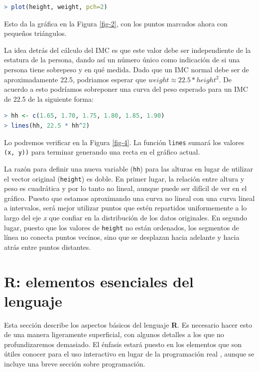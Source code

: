 \begin{lstlisting}[language=R]
> plot(height, weight, pch=2)
\end{lstlisting}

Esto da la gráfica en la Figura \ref{fig-2}, con los puntos marcados ahora
con pequeños triángulos.

La idea detrás del cálculo del IMC es que este valor debe ser independiente de
la estatura de la persona, dando así un número único como indicación de si una
persona tiene sobrepeso y en qué medida. Dado que un IMC normal debe ser de
aproximadamente 22.5, podriamos esperar que $weight \approx 22.5 * height^2$.
De acuerdo a esto podríamos sobreponer una curva del peso esperado para un IMC
de 22.5 de la siguiente forma:

\begin{lstlisting}[language=R]
> hh <- c(1.65, 1.70, 1.75, 1.80, 1.85, 1.90)
> lines(hh, 22.5 * hh^2)
\end{lstlisting}

Lo podremos verificar en la Figura \ref{fig-4}. La función \texttt{lines}
sumará los valores \texttt{(x, y))} para terminar generando una recta en el
gráfico actual.

La razón para definir una nueva variable (\texttt{hh}) para las alturas en
lugar de utilizar el vector original (\texttt{height}) es doble. En primer
lugar, la relación entre altura y peso es cuadrática y por lo tanto no lineal,
aunque puede ser difícil de ver en el gráfico. Puesto que estamos aproximando
una curva no lineal con una curva lineal a intervalos, será mejor utilizar
puntos que estén repartidos uniformemente a lo largo del eje \textit{x} que
confiar en la distribución de los datos originales. En segundo lugar, puesto
que los valores de \texttt{height} no están ordenados, los segmentos de línea
no conecta puntos vecinos, sino que se desplazan hacia adelante y hacia atrás
entre puntos distantes.

\section{R: elementos esenciales del lenguaje}

Esta sección describe los aspectos básicos del lenguaje \textbf{R}. Es
necesario hacer esto de una manera ligeramente superficial, con algunos
detalles a los que no profundizaremos demasiado.  El énfasis estará puesto en los
elementos que son útiles conocer para el uso interactivo en lugar de la
programación real , aunque se incluye una breve sección sobre programación.


